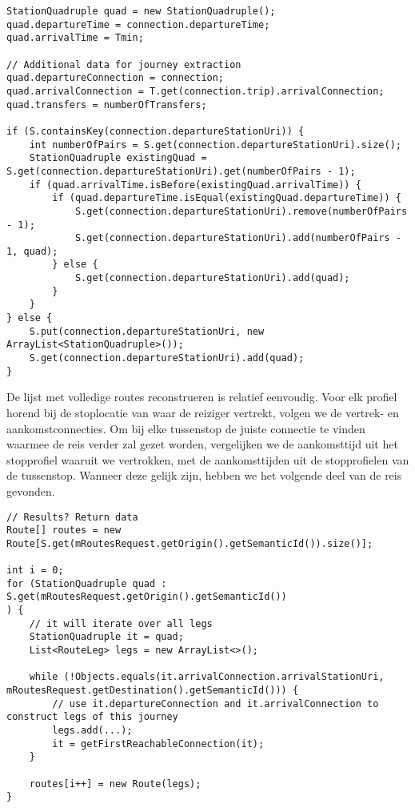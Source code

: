 \begin{code}
	\begin{verbatim}
StationQuadruple quad = new StationQuadruple();
quad.departureTime = connection.departureTime;
quad.arrivalTime = Tmin;

// Additional data for journey extraction
quad.departureConnection = connection;
quad.arrivalConnection = T.get(connection.trip).arrivalConnection;
quad.transfers = numberOfTransfers;

if (S.containsKey(connection.departureStationUri)) {
	int numberOfPairs = S.get(connection.departureStationUri).size();
	StationQuadruple existingQuad = S.get(connection.departureStationUri).get(numberOfPairs - 1);
	if (quad.arrivalTime.isBefore(existingQuad.arrivalTime)) {
		if (quad.departureTime.isEqual(existingQuad.departureTime)) {
			S.get(connection.departureStationUri).remove(numberOfPairs - 1);
			S.get(connection.departureStationUri).add(numberOfPairs - 1, quad);
		} else {
			S.get(connection.departureStationUri).add(quad);
		}
	}
} else {
	S.put(connection.departureStationUri, new ArrayList<StationQuadruple>());
	S.get(connection.departureStationUri).add(quad);
}
		\end{verbatim}
\end{code}
De lijst met volledige routes reconstrueren is relatief eenvoudig. Voor elk profiel horend bij de stoplocatie van waar de reiziger vertrekt, volgen we de vertrek- en aankomstconnecties. Om bij elke tussenstop de juiste connectie te vinden waarmee de reis verder zal gezet worden, vergelijken we de aankomsttijd uit het stopprofiel waaruit we vertrokken, met de aankomsttijden uit de stopprofielen van de tussenstop. Wanneer deze gelijk zijn, hebben we het volgende deel van de reis gevonden.
\begin{code}
\begin{verbatim}
// Results? Return data
Route[] routes = new Route[S.get(mRoutesRequest.getOrigin().getSemanticId()).size()];

int i = 0;
for (StationQuadruple quad : S.get(mRoutesRequest.getOrigin().getSemanticId())
) {
	// it will iterate over all legs
	StationQuadruple it = quad;
	List<RouteLeg> legs = new ArrayList<>();
	
	while (!Objects.equals(it.arrivalConnection.arrivalStationUri, mRoutesRequest.getDestination().getSemanticId())) {
		// use it.departureConnection and it.arrivalConnection to construct legs of this journey
		legs.add(...);
		it = getFirstReachableConnection(it);
	}
	
	routes[i++] = new Route(legs);
}
\end{verbatim}
\end{code}
